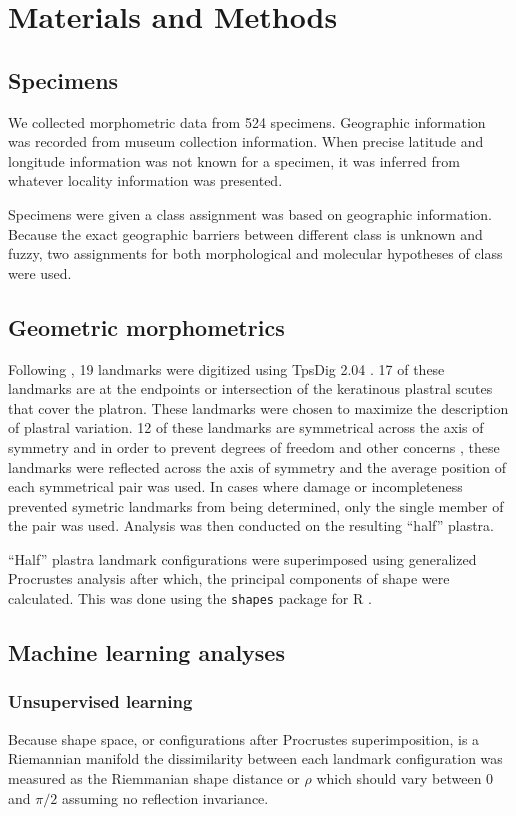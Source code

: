 \documentclass[12pt]{article}\usepackage{graphicx, color}
\begin{document}
\section{Materials and Methods}
\subsection{Specimens}
We collected morphometric data from 524 specimens. Geographic information was recorded from museum collection information. When precise latitude and longitude information was not known for a specimen, it was inferred from whatever locality information was presented. %

Specimens were given a class assignment was based on geographic information. Because the exact geographic barriers between different class is unknown and fuzzy, two assignments for both morphological and molecular hypotheses of class were used. 

\subsection{Geometric morphometrics}
Following \citet{Angielczyk2011}, 19 landmarks were digitized using TpsDig 2.04 \citep{Rohlf2005}. 17 of these landmarks are at the endpoints or intersection of the keratinous plastral scutes that cover the platron. These landmarks were chosen to maximize the description of plastral variation. 12 of these landmarks are symmetrical across the axis of symmetry and in order to prevent degrees of freedom and other concerns \citep{Klingenberg2007}, these landmarks were reflected across the axis of symmetry and the average position of each symmetrical pair was used. In cases where damage or incompleteness prevented symetric landmarks from being determined, only the single member of the pair was used. Analysis was then conducted on the resulting ``half'' plastra.

``Half'' plastra landmark configurations were superimposed using generalized Procrustes analysis \citep{Dryden1998a} after which, the principal components of shape were calculated. This was done using the \texttt{shapes} package for R \citep{2013, Dryden2013}.


\subsection{Machine learning analyses}
\subsubsection{Unsupervised learning}
Because shape space, or configurations after Procrustes superimposition, is a Riemannian manifold \citep{Dryden1998a} the dissimilarity between each landmark configuration was measured as the Riemmanian shape distance or \(\rho\) \citep{Kendall1984a,Dryden1998a} which should vary between 0 and \(\pi / 2\) assuming no reflection invariance.
\end{document}
